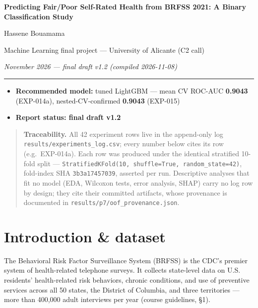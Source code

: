 \documentclass[11pt,a4paper]{article}
\providecommand{\tightlist}{\setlength{\itemsep}{2pt}\setlength{\parskip}{0pt}}
\begin{document}
\begin{center}
{\LARGE\bfseries Predicting Fair/Poor Self-Rated Health from BRFSS 2021: A Binary Classification Study}\par\vspace{1.0em}
{\normalsize Hassene Bouamama}\par\vspace{0.3em}
{\small Machine Learning final project --- University of Alicante (C2 call)}\par\vspace{0.8em}
{\small\itshape November 2026 --- final draft v1.2 (compiled 2026-11-08)}\par
\end{center}
\vspace{0.6em}

{\small \par}
\vspace{1.2em}
\hrule
\vspace{1.2em}

\tableofcontents
\newpage
\begin{itemize}
\tightlist
\item
  \textbf{Recommended model:} tuned LightGBM --- mean CV ROC-AUC
  \textbf{0.9043} (EXP-014a), nested-CV-confirmed \textbf{0.9043}
  (EXP-015)
\item
  \textbf{Report status: final draft v1.2}
\end{itemize}

\begin{quote}
\textbf{Traceability.} All 42 experiment rows live in the append-only
log \texttt{results/experiments\_log.csv}; every number below cites its
row (e.g.~EXP-014a). Each row was produced under the identical
stratified 10-fold split ---
\texttt{StratifiedKFold(10,\ shuffle=True,\ random\_state=42)},
fold-index SHA \texttt{3b3a17457039}, asserted per run. Descriptive
analyses that fit no model (EDA, Wilcoxon tests, error analysis, SHAP)
carry no log row by design; they cite their committed artifacts, whose
provenance is documented in \texttt{results/p7/oof\_provenance.json}.
\end{quote}

\section{Introduction \& dataset}\label{introduction-dataset}

The Behavioral Risk Factor Surveillance System (BRFSS) is the CDC's
premier system of health-related telephone surveys. It collects
state-level data on U.S. residents' health-related risk behaviors,
chronic conditions, and use of preventive services across all 50 states,
the District of Columbia, and three territories --- more than 400,000
adult interviews per year (course guidelines, \S{}1).
\end{document}
